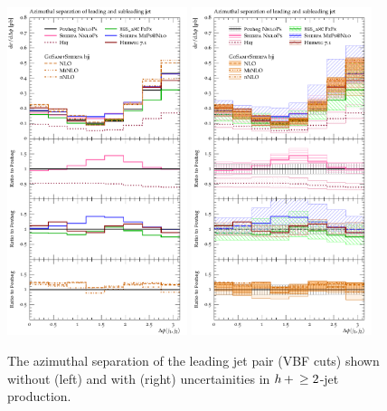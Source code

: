 \begin{figure}[t!]
  \centering
  \includegraphics[width=0.47\textwidth]{figures/hjetscomp_u_deltaphi_jj_VBF.pdf}
  \hfill
  \includegraphics[width=0.47\textwidth]{figures/hjetscomp_deltaphi_jj_VBF.pdf}
  \caption{\label{fig:hjetscomp:results:VBFobs:dphijj}%
    The azimuthal separation of the leading jet pair (VBF cuts) shown
    without (left) and with (right) uncertainities in $h\!\text{~+~}\!\ge2$-jet
    production.}
\end{figure}

